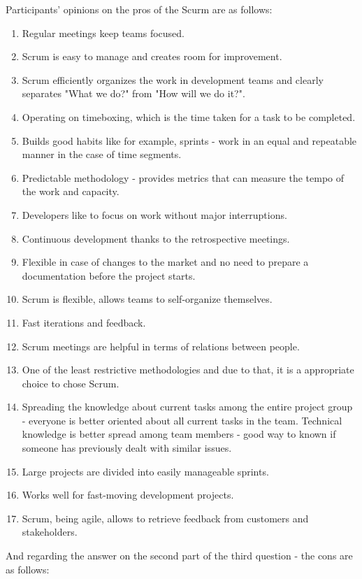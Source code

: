 Participants' opinions on the pros of the Scurm are as follows:
\begin{enumerate}
    \item Regular meetings keep teams focused.
    \item Scrum is easy to manage and creates room for improvement. 
    \item Scrum efficiently organizes the work in development teams and clearly separates "What we do?" from "How will we do it?".
    \item Operating on timeboxing, which is the time taken for a task to be completed.
    \item Builds good habits like for example, sprints - work in an equal and repeatable manner in the case of time segments.
    \item Predictable methodology - provides metrics that can measure the tempo of the work and capacity.
    \item Developers like to focus on work without major interruptions.
    \item Continuous development thanks to the retrospective meetings.
    \item Flexible in case of changes to the market and no need to prepare a documentation before the project starts.
    \item Scrum is flexible, allows teams to self-organize themselves.
    \item Fast iterations and feedback.
    \item Scrum meetings are helpful in terms of relations between people.
    \item One of the least restrictive methodologies and due to that, it is a appropriate choice to chose Scrum.
    \item Spreading the knowledge about current tasks among the entire project group - everyone is better oriented about all current tasks in the team. Technical knowledge is better spread among team members - good way to known if someone has previously dealt with similar issues.
    \item Large projects are divided into easily manageable sprints.
    \item Works well for fast-moving development projects.
    \item Scrum, being agile, allows to retrieve feedback from customers and stakeholders.
\end{enumerate}

And regarding the answer on the second part of the third question - the cons are as follows:

